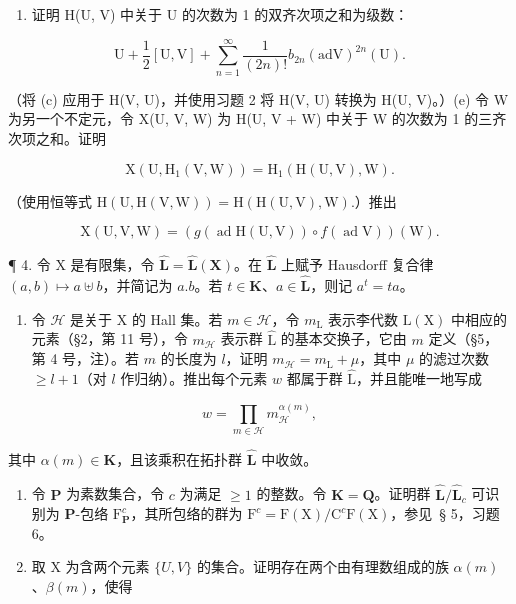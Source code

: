 \begin{enumerate}
\def\labelenumi{(\alph{enumi})}
\setcounter{enumi}{3}
\tightlist
\item
  证明 H(U, V) 中关于 U 的次数为 1 的双齐次项之和为级数：
\end{enumerate}

\[
\mathrm{U} + \frac {1}{2} [ \mathrm{U}, \mathrm{V} ] + \sum_ {n = 1} ^ {\infty} \frac {1}{(2 n) !} b _ {2 n} (\mathrm{adV}) ^ {2 n} (\mathrm{U}).
\]

（将 (c) 应用于 H(V, U)，并使用习题 2 将 H(V, U) 转换为 H(U, V)。）(e) 令 W 为另一个不定元，令 X(U, V, W) 为 H(U, V + W) 中关于 W 的次数为 1 的三齐次项之和。证明

\[
\mathrm{X} (\mathrm{U}, \mathrm{H} _ {1} (\mathrm{V}, \mathrm{W})) = \mathrm{H} _ {1} (\mathrm{H} (\mathrm{U}, \mathrm{V}), \mathrm{W}).
\]

（使用恒等式 \(\mathrm{H}(\mathrm{U},\mathrm{H}(\mathrm{V},\mathrm{W})) = \mathrm{H}(\mathrm{H}(\mathrm{U},\mathrm{V}),\mathrm{W}).\)）推出

\[
\mathrm{X} (\mathrm{U}, \mathrm{V}, \mathrm{W}) = (g (\operatorname{ad} \mathrm{H} (\mathrm{U}, \mathrm{V})) \circ f (\operatorname{ad} \mathrm{V})) (\mathrm{W}).
\]

¶ 4. 令 X 是有限集，令 \(\hat{\mathbf{L}} = \hat{\mathbf{L}}(\mathbf{X})\)。在 \(\hat{\mathbf{L}}\) 上赋予 Hausdorff 复合律 \((a, b) \mapsto a \uplus b\)，并简记为 \(a.b\)。若 \(t \in \mathbf{K}\)、\(a \in \hat{\mathbf{L}}\)，则记 \(a^t = t a\)。

\begin{enumerate}
\def\labelenumi{(\alph{enumi})}
\tightlist
\item
  令 \(\mathcal{H}\) 是关于 X 的 Hall 集。若 \(m \in \mathcal{H}\)，令 \(m_{\mathrm{L}}\) 表示李代数 \(\mathrm{L}(\mathrm{X})\) 中相应的元素（§2，第 11 号），令 \(m_{\mathcal{H}}\) 表示群 \(\hat{\mathrm{L}}\) 的基本交换子，它由 \(m\) 定义（§5，第 4 号，注）。若 \(m\) 的长度为 \(l\)，证明 \(m_{\mathcal{H}} = m_{\mathrm{L}} + \mu\)，其中 \(\mu\) 的滤过次数 \(\geqslant l + 1\)（对 \(l\) 作归纳）。推出每个元素 \(w\) 都属于群 \(\hat{\mathrm{L}}\)，并且能唯一地写成
\end{enumerate}

\[
w = \prod_ {m \in \mathcal {H}} m _ {\mathcal {H}} ^ {\alpha (m)},
\]


其中 \(\alpha(m) \in \mathbf{K}\)，且该乘积在拓扑群 \(\hat{\mathbf{L}}\) 中收敛。

\begin{enumerate}
\def\labelenumi{(\alph{enumi})}
\setcounter{enumi}{1}
\item
  令 \(\mathbf{P}\) 为素数集合，令 \(c\) 为满足 \(\geqslant 1\) 的整数。令 \(\mathbf{K} = \mathbf{Q}\)。证明群 \(\hat{\mathbf{L}} / \hat{\mathbf{L}}_c\) 可识别为 \(\mathbf{P}\)-包络 \(\mathrm{F}_{\mathbf{P}}^{c}\)，其所包络的群为 \(\mathrm{F}^c = \mathrm{F}(\mathrm{X}) / \mathrm{C}^c\mathrm{F}(\mathrm{X})\)，参见~§ 5，习题 6。
\item
  取 X 为含两个元素 \(\{U, V\}\) 的集合。证明存在两个由有理数组成的族 \(\alpha(m)\)、\(\beta(m)\)，使得
\end{enumerate}

